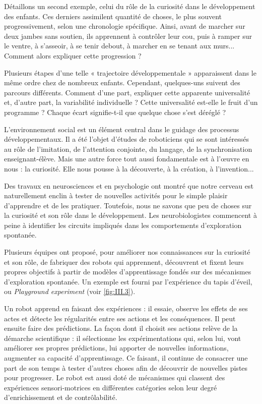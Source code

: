 Détaillons un second exemple, celui du rôle de la curiosité dans le développement des enfants. Ces derniers assimilent quantité de cho\-ses, le plus souvent progressivement, selon une chronologie spécifique. Ainsi, avant de marcher sur deux jambes sans soutien, ils apprennent à contrôler leur cou, puis à ramper sur le ventre, à s’asseoir, à se tenir debout, à marcher en se tenant aux murs... Comment alors expliquer cette progression ?

Plusieurs étapes d’une telle « trajectoire développementale » apparaissent dans le même ordre chez de nombreux enfants. Cependant, quelques-uns suivent des parcours différents. Comment d’une part, expliquer cette apparente universalité et, d’autre part, la variabilité individuelle ? Cette universalité est-elle le fruit d’un programme ? Chaque écart signifie-t-il que quelque chose s’est déréglé ? %

L’environnement social est un élément central dans le guidage des processus développementaux. Il a été l’objet d’études de roboticiens qui se sont intéressés au rôle de l’imitation, de l’attention conjointe, du langage, de la synchronisation enseignant-élève. Mais une autre force tout aussi fondamentale est à l’œuvre en nous : la curiosité. Elle nous pousse à la découverte, à la création, à l’invention...

Des travaux en neurosciences et en psychologie ont montré que notre cerveau est naturellement enclin à tester de nouvelles activités pour le simple plaisir d’apprendre et de les pratiquer. Toutefois, nous ne savons que peu de choses sur la curiosité et son rôle dans le développement. Les neurobiologistes commencent à peine à identifier les circuits impliqués dans les comportements d’exploration spontanée.

Plusieurs équipes ont proposé, pour améliorer nos connaissances sur la curiosité et son rôle, de fabriquer des robots qui apprennent, découvrent et fixent leurs propres objectifs à partir de modèles d’apprentissage fondés sur des mécanismes d’exploration spontanée. Un exemple est fourni par l’expérience du tapis d’éveil, ou \textit{Playground experiment} (voir \cref{fig:III.3}).

Un robot apprend en faisant des expériences : il essaie, observe les effets de ses actes et détecte les régularités entre ses actions et les conséquences. Il peut ensuite faire des prédictions. La façon dont il choisit ses actions relève de la démarche scientifique : il sélectionne les expérimentations qui, selon lui, vont améliorer ses propres prédictions, lui apporter de nouvelles informations, augmenter sa capacité d’apprentissage. Ce faisant, il continue de consacrer une part de son temps à tester d’autres choses afin de découvrir de nouvelles pistes pour progresser. Le robot est aussi doté de mécanismes qui classent des expériences sensori-motrices en différentes catégories selon leur degré d’enrichissement et de contrôlabilité.

